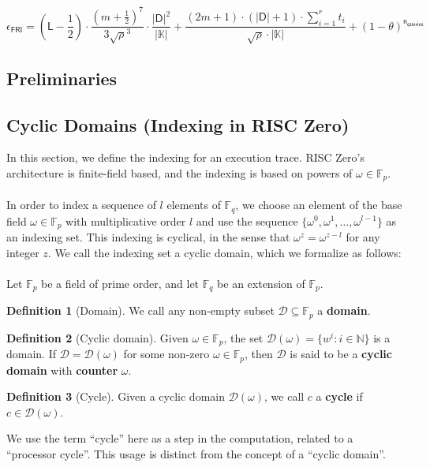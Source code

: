\documentclass[10pt,letterpaper,titlepage]{article}
\newcommand{\GF}[1]{\mathbb{F}_{#1}}
\newcommand{\w}[0]{\omega}
\newcommand{\D}[0]{\mathcal{D}}
\theoremstyle{definition}
\newtheorem{definition}{Definition}
\begin{document}
\[ 
    \epsilon_\mathsf{FRI} =
    (\mathsf{L}-\frac{1}{2})\cdot\frac{(m+\frac{1}{2})^7}{3\sqrt{\rho}^3}\cdot\frac{|\mathsf{D}|^2}{|\mathbb{K}|} 
    + 
    \frac{(2m+1)\cdot(|\mathsf{D}|+1)\cdot\sum^r_{i=1}t_i}{\sqrt{\rho}\cdot|\mathbb{K}|}
    +
    (1-\theta)^\mathsf{n_{queries}}
  \]
\pagebreak
\printbibliography
\pagebreak
\begin{appendices}
\section{Preliminaries}
\label{preliminaries}
\subsection{Cyclic Domains (Indexing in RISC Zero)}
\label{sequential time}
\label{cyclic domains}
In this section, we define the indexing for an execution trace. RISC Zero's architecture is finite-field based, and the indexing is based on powers of $\w\in\GF{p}$. \\
\\
In order to index a sequence of $l$ elements of $\GF{q}$, we choose an element of the base field $\w\in\GF{p}$ with multiplicative order $l$ and use the sequence $\{\w^0, \w^1, \ldots, \w^{l-1}\}$ as an indexing set. 
This indexing is cyclical, in the sense that $\w^z=\w^{z-l}$ for any integer $z$. 
We call the indexing set a cyclic domain, which we formalize as follows: \\
\\
Let $\GF{p}$ be a field of prime order, and let $\GF{q}$ be an extension of $\GF{p}$.
\begin{definition}[Domain] 
  We call any non-empty subset $\D\subseteq\GF{p}$ a \textbf{domain}.
\end{definition}
\begin{definition}[Cyclic domain] 
  Given $\w\in\GF{p}$, the set $\D(\omega)=\{w^i:i\in\mathbb{N}\}$ is a domain. 
  If $\D=\D(\w)$ for some non-zero $\w\in\GF{p}$, then $\D$ is said to be a \textbf{cyclic domain} with \textbf{counter} $\w$. 
\end{definition}
\begin{definition}[Cycle]
  Given a cyclic domain $\D(\w)$, we call $c$ a \textbf{cycle} if $c\in\D(\omega)$. 
\end{definition}
\noindent 
We use the term ``cycle'' here as a step in the computation, related to a ``processor cycle''.
This usage is distinct from the concept of a ``cyclic domain''.\\

\end{appendices}
\end{document}
